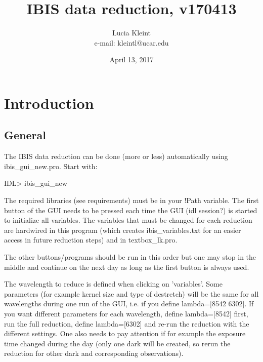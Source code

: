 \documentclass[a4paper,12pt]{article}
\begin{document}

\title{IBIS data reduction, v170413}

\author{Lucia Kleint \\
e-mail: \mbox{kleintl@ucar.edu}
}

\date{April 13, 2017}

\maketitle
\newpage

\tableofcontents
\newpage


\section{Introduction}
\subsection{General}
The IBIS data reduction can be done (more or less) automatically using ibis\_gui\_new.pro. Start with:

IDL> ibis\_gui\_new

The required libraries (see requirements) must be in your !Path variable. The first button of the GUI needs to be pressed each time the GUI (idl session?) is started to initialize all variables. The variables that must be changed for each reduction are hardwired in this program (which creates ibis\_variables.txt
for an easier access in future reduction steps) and in textbox\_lk.pro.

The other buttons/programs should be run in this order but one may stop
in the middle and continue on the next day as long as the first button
is always used.

The wavelength to reduce is defined when clicking on 'variables'. 
Some parameters (for example kernel size and type of destretch) will
be the same for all wavelengths during one run of the GUI, i.e. if
you define lambda=[8542 6302]. If you want different parameters for
each wavelength, define lambda=[8542] first, run the full reduction,
define lambda=[6302] and re-run the reduction with the different
settings. One also needs to pay attention if for example the exposure
time changed during the day (only one dark will be created, so rerun
the reduction for other dark and corresponding observations).
\end{document}
